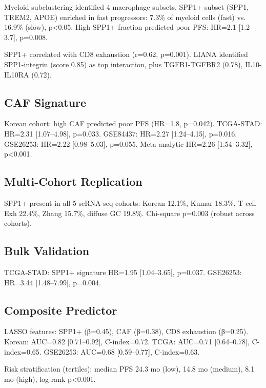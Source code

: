 \documentclass[12pt,twoside]{article}
\begin{document}
Myeloid subclustering identified 4 macrophage subsets. SPP1+ subset (SPP1, TREM2, APOE) enriched in fast progressors: 7.3\% of myeloid cells (fast) vs. 16.9\% (slow), p<0.05. High SPP1+ fraction predicted poor PFS: HR=2.1 [1.2--3.7], p=0.008.

SPP1+ correlated with CD8 exhaustion (r=0.62, p=0.001). LIANA identified SPP1-integrin (score 0.85) as top interaction, plus TGFB1-TGFBR2 (0.78), IL10-IL10RA (0.72).

\subsection{CAF Signature}

Korean cohort: high CAF predicted poor PFS (HR=1.8, p=0.042). TCGA-STAD: HR=2.31 [1.07--4.98], p=0.033. GSE84437: HR=2.27 [1.24--4.15], p=0.016. GSE26253: HR=2.22 [0.98--5.03], p=0.055. Meta-analytic HR=2.26 [1.54--3.32], p<0.001.

\subsection{Multi-Cohort Replication}

SPP1+ present in all 5 scRNA-seq cohorts: Korean 12.1\%, Kumar 18.3\%, T cell Exh 22.4\%, Zhang 15.7\%, diffuse GC 19.8\%. Chi-square p=0.003 (robust across cohorts).

\subsection{Bulk Validation}

TCGA-STAD: SPP1+ signature HR=1.95 [1.04--3.65], p=0.037. GSE26253: HR=3.44 [1.48--7.99], p=0.004.

\subsection{Composite Predictor}

LASSO features: SPP1+ (β=0.45), CAF (β=0.38), CD8 exhaustion (β=0.25). Korean: AUC=0.82 [0.71--0.92], C-index=0.72. TCGA: AUC=0.71 [0.64--0.78], C-index=0.65. GSE26253: AUC=0.68 [0.59--0.77], C-index=0.63.

Risk stratification (tertiles): median PFS 24.3 mo (low), 14.8 mo (medium), 8.1 mo (high), log-rank p<0.001.

\end{document}
